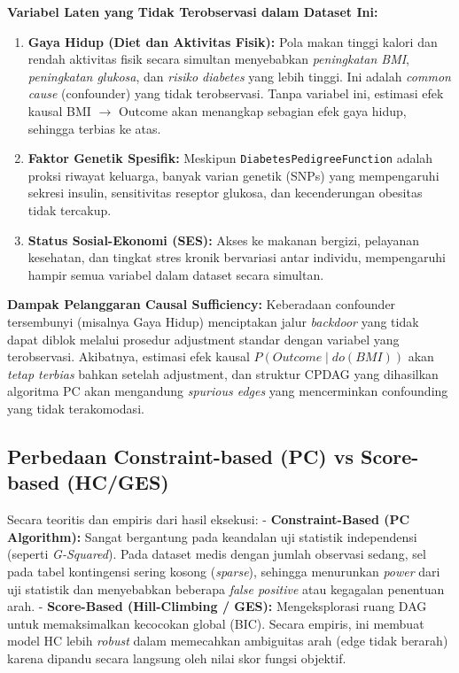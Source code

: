 \documentclass[
  11pt,
]{article}
\begin{document}
\textbf{Variabel Laten yang Tidak Terobservasi dalam Dataset Ini:}

\begin{enumerate}
\def\labelenumi{\arabic{enumi}.}
\item
  \textbf{Gaya Hidup (Diet dan Aktivitas Fisik):} Pola makan tinggi
  kalori dan rendah aktivitas fisik secara simultan menyebabkan
  \emph{peningkatan BMI}, \emph{peningkatan glukosa}, dan \emph{risiko
  diabetes} yang lebih tinggi. Ini adalah \emph{common cause}
  (confounder) yang tidak terobservasi. Tanpa variabel ini, estimasi
  efek kausal BMI \(\to\) Outcome akan menangkap sebagian efek gaya
  hidup, sehingga terbias ke atas.
\item
  \textbf{Faktor Genetik Spesifik:} Meskipun
  \texttt{DiabetesPedigreeFunction} adalah proksi riwayat keluarga,
  banyak varian genetik (SNPs) yang mempengaruhi sekresi insulin,
  sensitivitas reseptor glukosa, dan kecenderungan obesitas tidak
  tercakup.
\item
  \textbf{Status Sosial-Ekonomi (SES):} Akses ke makanan bergizi,
  pelayanan kesehatan, dan tingkat stres kronik bervariasi antar
  individu, mempengaruhi hampir semua variabel dalam dataset secara
  simultan.
\end{enumerate}

\textbf{Dampak Pelanggaran Causal Sufficiency:} Keberadaan confounder
tersembunyi (misalnya Gaya Hidup) menciptakan jalur \emph{backdoor} yang
tidak dapat diblok melalui prosedur adjustment standar dengan variabel
yang terobservasi. Akibatnya, estimasi efek kausal
\(P(Outcome \mid do(BMI))\) akan \emph{tetap terbias} bahkan setelah
adjustment, dan struktur CPDAG yang dihasilkan algoritma PC akan
mengandung \emph{spurious edges} yang mencerminkan confounding yang
tidak terakomodasi.

\subsection{Perbedaan Constraint-based (PC) vs Score-based
(HC/GES)}\label{perbedaan-constraint-based-pc-vs-score-based-hcges}

Secara teoritis dan empiris dari hasil eksekusi: -
\textbf{Constraint-Based (PC Algorithm):} Sangat bergantung pada
keandalan uji statistik independensi (seperti \emph{G-Squared}). Pada
dataset medis dengan jumlah observasi sedang, sel pada tabel kontingensi
sering kosong (\emph{sparse}), sehingga menurunkan \emph{power} dari uji
statistik dan menyebabkan beberapa \emph{false positive} atau kegagalan
penentuan arah. - \textbf{Score-Based (Hill-Climbing / GES):}
Mengeksplorasi ruang DAG untuk memaksimalkan kecocokan global (BIC).
Secara empiris, ini membuat model HC lebih \emph{robust} dalam
memecahkan ambiguitas arah (edge tidak berarah) karena dipandu secara
langsung oleh nilai skor fungsi objektif.
\end{document}

